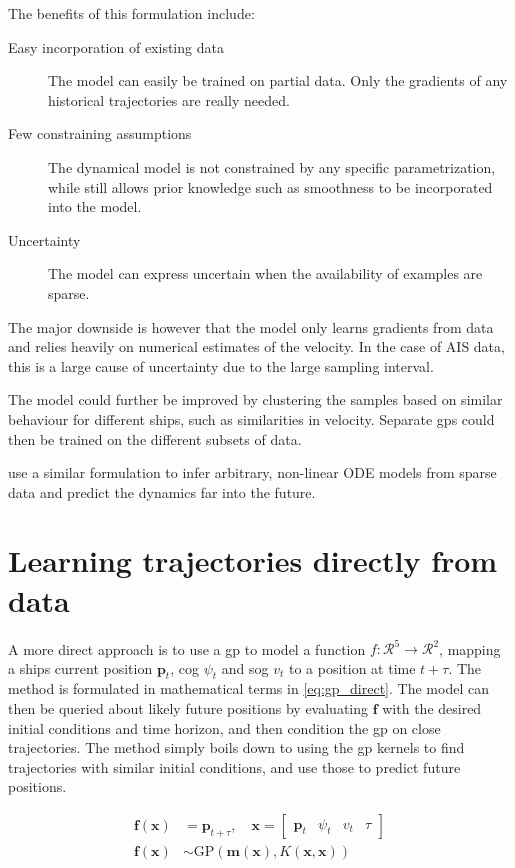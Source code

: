 The benefits of this formulation include:
\begin{description}
    \item[Easy incorporation of existing data] The model can easily be trained on partial data. Only the gradients of any historical trajectories are really needed.
    \item[Few constraining assumptions] The dynamical model is not constrained by any specific parametrization, while still allows prior knowledge such as smoothness to be incorporated into the model.
    \item[Uncertainty] The model can express uncertain when the availability of examples are sparse. 
\end{description}

The major downside is however that the model only learns gradients from data and relies heavily on numerical estimates of the velocity. In the case of AIS data, this is a large cause of uncertainty due to the large sampling interval.

The model could further be improved by clustering the samples based on similar behaviour for different ships, such as similarities in velocity. Separate \acrshort{gp}s could then be trained on the different subsets of data.

\cite{heinonen2018learningode} use a similar formulation to infer arbitrary, non-linear ODE models from sparse data and predict the dynamics far into the future. 



\section{Learning trajectories directly from data}
A more direct approach is to use a \acrshort{gp} to model a function $f: \mathcal{R}^5 \to \mathcal{R}^2$, mapping a ships current position $\boldsymbol{p}_t$, \acrshort{cog} $\psi_t$ and \acrshort{sog} $v_t$ to a position at time $t+\tau$. The method is formulated in mathematical terms in \cref{eq:gp_direct}. The model can then be queried about likely future positions by evaluating $\boldsymbol{f}$ with the desired initial conditions and time horizon, and then condition the \acrshort{gp} on close trajectories. 
The method simply boils down to using the \acrshort{gp} kernels to find trajectories with similar initial conditions, and use those to predict future positions.

\begin{subequations}\label{eq:gp_direct}
\begin{align}
    \boldsymbol{f}(\boldsymbol{x}) &= \boldsymbol{p}_{t+\tau} \label{eq:gp_direct_f}, \quad \boldsymbol{x} = \begin{bmatrix} \boldsymbol{p}_t & \psi_t & v_t & \tau\end{bmatrix}\\
    \boldsymbol{f}(\boldsymbol{x}) &\sim \text{GP}(\boldsymbol{m}(\boldsymbol{x}), K(\boldsymbol{x}, \boldsymbol{x}))\label{eq:gp_direct_f_dist}
\end{align} 
\end{subequations}

